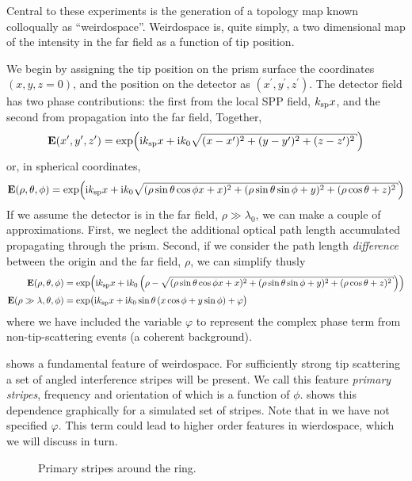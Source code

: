 Central to these experiments is the generation of a topology map known
colloqually as ``weirdospace''.  Weirdospace is, quite simply, a two
dimensional map of the intensity in the far field as a function of tip position.  

We begin by assigning the tip position on the prism surface the coordinates
$(x,y,z=0)$, and the position on the detector as
$(x^\prime,y^\prime,z^\prime)$.  The detector field has two phase
contributions: the first from the local SPP field, $k_\mathrm{sp} x$, and the second
from propagation into the far field, Together,
\begin{equation}
\mathbf{E}(x^\prime,y^\prime,z^\prime) = \exp\!\left( \mi\ksp x + %
\mi k_0\sqrt{ (x-x^\prime)^2+ (y-y^\prime)^2+ (z-z^\prime)^2 } \right)
\end{equation}
or, in spherical coordinates,
\begin{equation}
\mathbf{E}(\rho,\theta,\phi) = \exp\!\left( \mi\ksp x + %
\mi k_0\sqrt{
(\rho\sin\theta\cos\phi x+x)^2+(\rho\sin\theta\sin\phi+y)^2+(\rho\cos\theta+z)^2 } \right)
\label{eqn:dingusthusly}
\end{equation}
If we assume the detector is in the far field, $\rho\gg\lambda_0$, we can
make a couple of approximations.  First, we neglect the additional optical
path length accumulated propagating through the prism.  Second, if we
consider the path length \textit{difference} between the origin and the far field,
$\rho$, we can simplify  thusly
\begin{align}
\mathbf{E}(\rho,\theta,\phi) &= \exp\!\left( \mi\ksp x + %
\mi k_0\left(\rho-\sqrt{ (\rho\sin\theta\cos\phi x+x)^2+(\rho\sin\theta\sin\phi+y)^2+(\rho\cos\theta+z)^2
}\right) \right)\\
\mathbf{E}(\rho\gg\lambda,\theta,\phi) &= \exp\!\big( \mi \ksp x
 + \mi k_0 \sin\theta \left(x\cos\phi+y\sin\phi\right)
 + \varphi\big)
	\label{eqn:primarystripes}
\end{align}
where we have included the variable $\varphi$ to represent the complex phase term
from non-tip-scattering events (a coherent background).  

 shows a fundamental feature of weirdospace.
For sufficiently strong tip scattering a set of angled interference stripes
will be present.  We call this feature \textit{primary stripes},
frequency and orientation of which is a function of $\phi$.
 shows this
dependence graphically for a simulated set of stripes.  Note that in
 we have not specified $\varphi$.  This term
could lead to higher order features in wierdospace, which we will discuss
in turn.
\begin{figure}
\centering
\caption{Primary stripes around the ring.}
\label{fig:primarystripes}
\end{figure}

